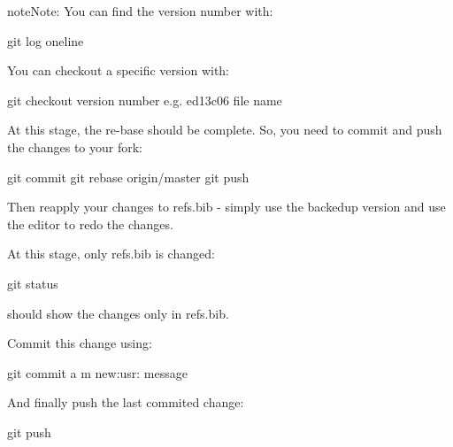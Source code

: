 \begin{sphinxadmonition}{note}{Note:}
You can find the version number with:

\begin{sphinxVerbatim}[commandchars=\\\{\}]
\PYGZdl{} git log \PYGZhy{}\PYGZhy{}oneline
\end{sphinxVerbatim}

You can checkout a specific version with:

\begin{sphinxVerbatim}[commandchars=\\\{\}]
\PYGZdl{} git checkout \PYGZlt{}version number \PYGZhy{} e.g. ed13c06\PYGZgt{} \PYGZlt{}file name\PYGZgt{}
\end{sphinxVerbatim}
\end{sphinxadmonition}

At this stage, the re-base should be complete. So, you need to commit
and push the changes to your fork:

\begin{sphinxVerbatim}[commandchars=\\\{\}]
\PYGZdl{} git commit
\PYGZdl{} git rebase origin/master
\PYGZdl{} git push
\end{sphinxVerbatim}

Then reapply your changes to refs.bib - simply use the backedup
version and use the editor to redo the changes.

At this stage, only refs.bib is changed:

\begin{sphinxVerbatim}[commandchars=\\\{\}]
\PYGZdl{} git status
\end{sphinxVerbatim}

should show the changes only in refs.bib.

Commit this change using:

\begin{sphinxVerbatim}[commandchars=\\\{\}]
\PYGZdl{} git commit \PYGZhy{}a \PYGZhy{}m \PYGZdq{}new:usr: \PYGZlt{}message\PYGZgt{}\PYGZdq{}
\end{sphinxVerbatim}

And finally push the last commited change:

\begin{sphinxVerbatim}[commandchars=\\\{\}]
\PYGZdl{} git push
\end{sphinxVerbatim}

